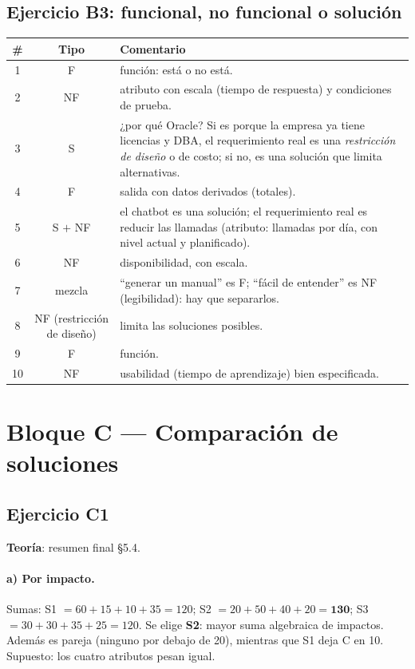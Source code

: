 \documentclass[11pt,a4paper]{article}
\begin{document}
\subsection*{Ejercicio B3: funcional, no funcional o solución}
\begin{center}\small
\begin{tabularx}{\textwidth}{@{}c c X@{}}
\toprule
\# & Tipo & Comentario\\
\midrule
1 & F & función: está o no está.\\
2 & NF & atributo con escala (tiempo de respuesta) y condiciones de prueba.\\
3 & S & ¿por qué Oracle? Si es porque la empresa ya tiene licencias y DBA, el requerimiento real es una
\emph{restricción de diseño} o de costo; si no, es una solución que limita alternativas.\\
4 & F & salida con datos derivados (totales).\\
5 & S $+$ NF & el chatbot es una solución; el requerimiento real es reducir las llamadas (atributo: llamadas por
día, con nivel actual y planificado).\\
6 & NF & disponibilidad, con escala.\\
7 & mezcla & ``generar un manual'' es F; ``fácil de entender'' es NF (legibilidad): hay que separarlos.\\
8 & NF (restricción de diseño) & limita las soluciones posibles.\\
9 & F & función.\\
10 & NF & usabilidad (tiempo de aprendizaje) bien especificada.\\
\bottomrule
\end{tabularx}
\end{center}

\section{Bloque C --- Comparación de soluciones}
\subsection*{Ejercicio C1}
\textbf{Teoría}: resumen final §5.4.
\paragraph{a) Por impacto.} Sumas: S1 $= 60 + 15 + 10 + 35 = 120$; S2 $= 20 + 50 + 40 + 20 = \mathbf{130}$; S3
$= 30 + 30 + 35 + 25 = 120$. Se elige \textbf{S2}: mayor suma algebraica de impactos. Además es pareja (ninguno
por debajo de 20), mientras que S1 deja C en 10. Supuesto: los cuatro atributos pesan igual.
\end{document}
